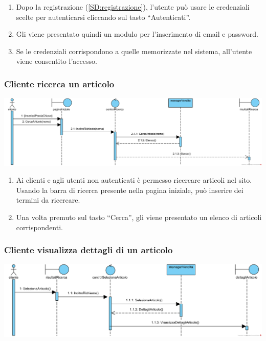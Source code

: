\documentclass[12pt]{article}
\begin{document}
\begin{enumerate}
\item Dopo la registrazione (\ref{SD:registrazione}), l'utente può usare le credenziali scelte per autenticarsi cliccando sul tasto ``Autenticati''.
\item Gli viene presentato quindi un modulo per l'inserimento di email e password.
\item Se le credenziali corrispondono a quelle memorizzate nel sistema, all'utente viene consentito l'accesso.
\end{enumerate}

\subsubsection{Cliente ricerca un articolo}
\label{SD:ricerca}

\begin{center}
\includegraphics[width=\textwidth]{SequenceDiagram/ClienteArticoloRicerca}
\end{center}

\begin{enumerate}
\item Ai clienti e agli utenti non autenticati è permesso ricercare articoli nel sito. Usando la barra di ricerca presente nella pagina iniziale, può inserire dei termini da ricercare.
\item Una volta premuto sul tasto ``Cerca'', gli viene presentato un elenco di articoli corrispondenti.
\end{enumerate}

\subsubsection{Cliente visualizza dettagli di un articolo}
\label{SD:dettagli}

\begin{center}
\includegraphics[width=\textwidth]{SequenceDiagram/ClienteArticoloSeleziona}
\end{center}
\end{document}
